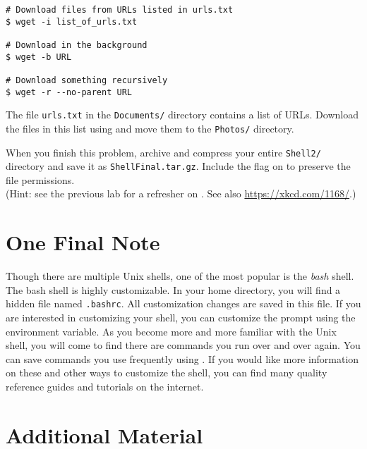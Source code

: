\begin{lstlisting}
# Download files from URLs listed in urls.txt
$ wget -i list_of_urls.txt

# Download in the background
$ wget -b URL

# Download something recursively
$ wget -r --no-parent URL
\end{lstlisting}

\begin{problem}
The file \texttt{urls.txt} in the \texttt{Documents/} directory contains a list of URLs.
Download the files in this list using  and move them to the \texttt{Photos/} directory.

When you finish this problem, archive and compress your entire \texttt{Shell2/} directory and save it as \texttt{ShellFinal.tar.gz}.
Include the  flag on  to preserve the file permissions.
\\(Hint: see the previous lab for a refresher on .
See also \url{https://xkcd.com/1168/}.)
\end{problem}

\section*{One Final Note} %

Though there are multiple Unix shells, one of the most popular is the \emph{bash} shell.
The bash shell is highly customizable.
In your home directory, you will find a hidden file named \texttt{.bashrc}.
All customization changes are saved in this file.
If you are interested in customizing your shell, you can customize the prompt using the  environment variable.
As you become more and more familiar with the Unix shell, you will come to find there are commands you run over and over again.
You can save commands you use frequently using .
If you would like more information on these and other ways to customize the shell, you can find many quality reference guides and tutorials on the internet.


\newpage

\section*{Additional Material} %

